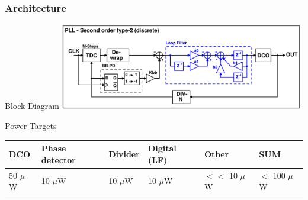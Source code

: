 \documentclass[t, screen, aspectratio=43]{beamer}
\begin{document}
\begin{frame}
	\frametitle{Architecture}
	\begin{block}{Block Diagram}
	\center\includegraphics[width=0.8\textwidth, angle=0]{pll_sec_order_bb.pdf}

	\end{block}
		\begin{block}{Power Targets}
		\vspace{-.1em}
		\begin{table}[htb!]
			\tiny
			\centering
			\def\arraystretch{1.5}		
			\setlength\arrayrulewidth{0.75pt}
			\setlength{\tabcolsep}{1em} %
			\begin{tabular}{|l|l|l|l|l|l|}
				\hline 
				\rule[-1ex]{0pt}{2.5ex} \cellcolor{gray!40}\textbf{DCO} & \cellcolor{gray!40}\textbf{Phase detector} & \cellcolor{gray!40}\textbf{Divider }& \cellcolor{gray!40}\textbf{Digital (LF)}& \cellcolor{gray!40}\textbf{Other} & \cellcolor{gray!40}\textbf{SUM} \\ 
				\hline 
				\rule[-1ex]{0pt}{2.5ex} 50 $\mu$W& 10 $\mu$W & 10 $\mu$W & 10 $\mu$W  & $<<$ 10 $\mu$W & $<$ 100 $\mu$W\\ 
				\hline 
			\end{tabular} 
		\end{table}   
	\end{block}

\end{frame}

\end{document}
